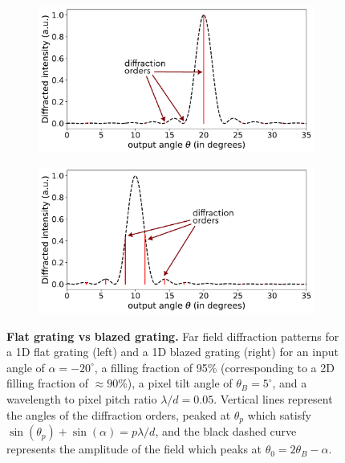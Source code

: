 \documentclass[12pt]{iopart}
\begin{document}
\begin{figure}
  \centering
  \begin{subfigure}{0.49\textwidth}
    \centering
    \includegraphics[width = \textwidth]{images/gratings_flat.pdf}
    \label{fig:flat_grating}
  \end{subfigure}
  \begin{subfigure}{0.49\textwidth}
    \centering
    \includegraphics[width = \textwidth]{images/gratings_blazed.pdf}
    \label{fig:blazed_right}
  \end{subfigure}
  \caption{
    \textbf{Flat grating vs blazed grating.}
    Far field diffraction patterns for a 1D flat grating (left) and a 1D blazed grating (right)
    for an input angle of $\alpha = -20^\circ$,
    a filling fraction of 95\% (corresponding to a 2D filling fraction of $\approx 90$\%),
    a pixel tilt angle of $\theta_B = 5^\circ$,
    and a wavelength to pixel pitch ratio $\lambda/d=0.05$.
    Vertical lines represent the angles of the diffraction orders, peaked at $\theta_p$ which satisfy $\sin(\theta_p)+\sin(\alpha)=p\lambda/d$, 
    and the black dashed curve represents the amplitude of the field which peaks at $\theta_0=2\theta_B-\alpha$.
  }
  \label{fig:gratings}
\end{figure}
\end{document}
